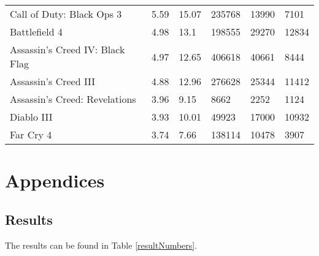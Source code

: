 \begin{table*}[!ht]
\begin{tabular}{llllll}
		\multicolumn{1}{l|}{Call of Duty: Black Ops 3}       & 5.59            & 15.07          & 235768                & 13990                                                                            & 7101                                                                            \\
		\multicolumn{1}{l|}{Battlefield 4}                   & 4.98            & 13.1           & 198555                & 29270                                                                            & 12834                                                                           \\
		\multicolumn{1}{l|}{Assassin's Creed IV: Black Flag} & 4.97            & 12.65          & 406618                & 40661                                                                            & 8444                                                                            \\
		\multicolumn{1}{l|}{Assassin's Creed III}            & 4.88            & 12.96          & 276628                & 25344                                                                            & 11412                                                                           \\
		\multicolumn{1}{l|}{Assassin's Creed: Revelations}   & 3.96            & 9.15           & 8662                  & 2252                                                                             & 1124                                                                            \\
		\multicolumn{1}{l|}{Diablo III}                      & 3.93            & 10.01          & 49923                 & 17000                                                                            & 10932                                                                           \\
		\multicolumn{1}{l|}{Far Cry 4}                       & 3.74            & 7.66           & 138114                & 10478                                                                            & 3907                                                                           
	\end{tabular}
\end{table*}

\section{Appendices}
\subsection{Results}
The results can be found in Table \ref{resultNumbers}.
